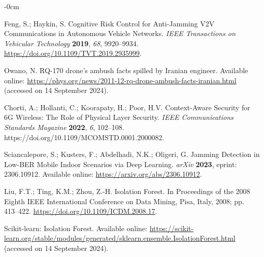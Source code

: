 \documentclass[futureinternet,article,submit,pdftex,moreauthors]{Definitions/mdpi}
\begin{document}
\begin{adjustwidth}{-\extralength}{0cm}
\begin{thebibliography}{999}
Feng, S.; Haykin, S. Cognitive Risk Control for Anti-Jamming V2V Communications in Autonomous Vehicle Networks. {\em IEEE Transactions on Vehicular Technology} {\bf 2019}, {\em 68}, 9920--9934. \url{https://doi.org/10.1109/TVT.2019.2935999}.

Owano, N. RQ-170 drone's ambush facts spilled by Iranian engineer. Available online: \url{https://phys.org/news/2011-12-rq-drone-ambush-facts-iranian.html} (accessed on 14 September 2024).

Chorti, A.; Hollanti, C.; Koorapaty, H.; Poor, H.V. Context-Aware Security for 6G Wireless: The Role of Physical Layer Security. {\em IEEE Communications Standards Magazine} {\bf 2022}, {\em 6}, 102--108. https://doi.org/10.1109/MCOMSTD.0001.2000082.

Sciancalepore, S.; Kusters, F.; Abdelhadi, N.K.; Oligeri, G. Jamming Detection in Low-BER Mobile Indoor Scenarios via Deep Learning. {\em arXiv} {\bf 2023}, eprint: 2306.10912. Available online: \url{https://arxiv.org/abs/2306.10912}.

Liu, F.T.; Ting, K.M.; Zhou, Z.-H. Isolation Forest. In Proceedings of the 2008 Eighth IEEE International Conference on Data Mining, Pisa, Italy, 2008; pp. 413--422. \url{https://doi.org/10.1109/ICDM.2008.17}.

Scikit-learn: Isolation Forest. Available online: \url{https://scikit-learn.org/stable/modules/generated/sklearn.ensemble.IsolationForest.html} (accessed on 14 September 2024).

\end{thebibliography}

%



\PublishersNote{}
\end{adjustwidth}
\end{document}

